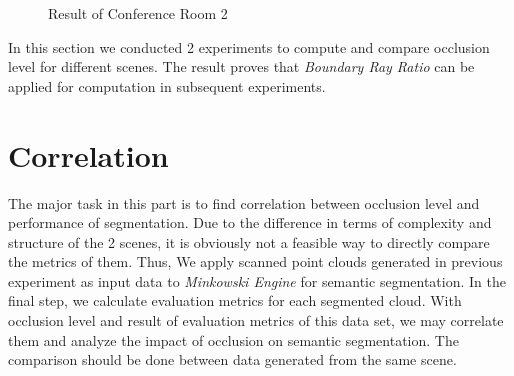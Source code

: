 \documentclass[11pt, a4paper,oneside,chapterprefix=false]{scrbook}
\begin{document}
\begin{figure}[H]
    \centering
    \caption{Result of Conference Room 2}
    \label{fig:result of conference room 2}
\end{figure}


In this section we conducted 2 experiments to compute and compare occlusion level for different scenes. The result proves that \emph{Boundary Ray Ratio} can be applied for computation in subsequent experiments.

\section{Correlation} \label{sec:correlation}

The major task in this part is to find correlation between occlusion level and performance of segmentation. Due to the difference in terms of complexity and structure of the 2 scenes, it is obviously not a feasible way to directly compare the metrics of them. Thus, We apply scanned point clouds generated in previous experiment as input data to \emph{Minkowski Engine} for semantic segmentation. In the final step, we calculate evaluation metrics for each segmented cloud. With occlusion level and result of evaluation metrics of this data set, we may correlate them and analyze the impact of occlusion on semantic segmentation. The comparison should be done between data generated from the same scene.
\end{document}
